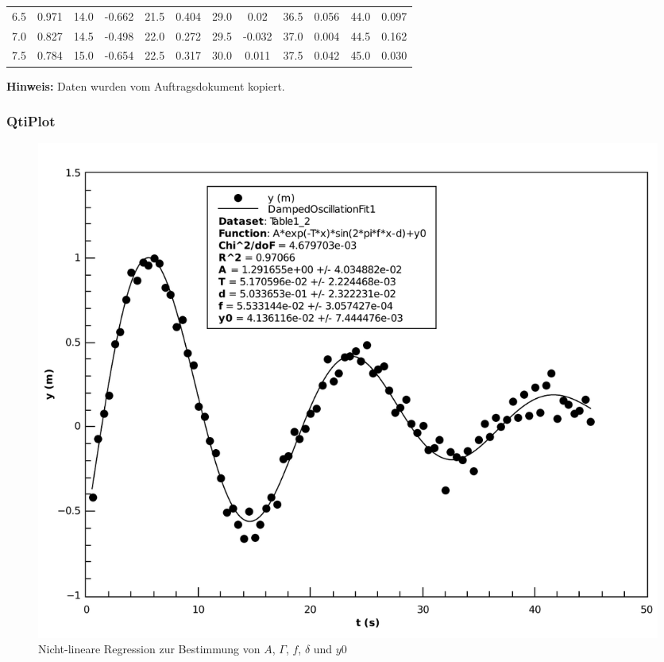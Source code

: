 \begin{center}
\begin{threeparttable}
\begin{tabular}{*{12}{c}}
            6.5     & 0.971     & 14.0      & -0.662    & 21.5     & 0.404      & 29.0      & 0.02      & 36.5      & 0.056     & 44.0      & 0.097   \\
            7.0     & 0.827     & 14.5      & -0.498    & 22.0     & 0.272      & 29.5      & -0.032    & 37.0      & 0.004     & 44.5      & 0.162   \\
            7.5     & 0.784     & 15.0      & -0.654    & 22.5     & 0.317      & 30.0      & 0.011     & 37.5      & 0.042     & 45.0      & 0.030   \\
            \bottomrule
        \end{tabular}
        \begin{tablenotes}
            \small
            \item \textbf{Hinweis:} Daten wurden vom Auftragsdokument kopiert.
        \end{tablenotes}
    \end{threeparttable}
\end{center}


\subsubsection*{QtiPlot}

\begin{figure}[H]
    \center
    \includegraphics[width=.85\textwidth]{qtiplot/pendel}
    \caption{Nicht-lineare Regression zur Bestimmung von $A$, $\Gamma$, $f$, $\delta$ und $y0$}
    \label{fig:pendel}
\end{figure}

